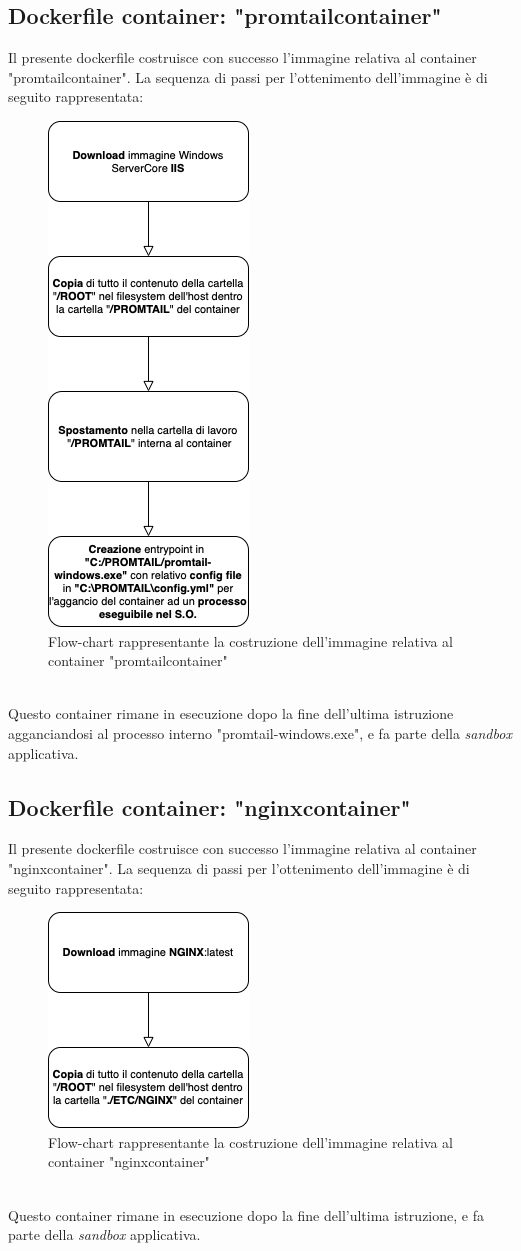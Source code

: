 \subsection{Dockerfile container: "promtailcontainer"}
Il presente dockerfile costruisce con successo l'immagine relativa al container "promtailcontainer". La sequenza di passi per l'ottenimento dell'immagine è di seguito rappresentata:
\begin{figure}[!h]     
\centering 
    \includegraphics[width=0.3\columnwidth]{immagini/flowchart/flowchart_promtailcontainer} 
    \caption{Flow-chart rappresentante la costruzione dell'immagine relativa al container "promtailcontainer"}
\end{figure} \\
Questo container rimane in esecuzione dopo la fine dell'ultima istruzione agganciandosi al processo interno "promtail-windows.exe", e fa parte della \textit{sandbox} applicativa.
\newpage
\subsection{Dockerfile container: "nginxcontainer"}
Il presente dockerfile costruisce con successo l'immagine relativa al container "nginxcontainer". La sequenza di passi per l'ottenimento dell'immagine è di seguito rappresentata:
\begin{figure}[!h]     
\centering 
    \includegraphics[width=0.3\columnwidth]{immagini/flowchart/flowchart_nginxcontainer} 
    \caption{Flow-chart rappresentante la costruzione dell'immagine relativa al container "nginxcontainer"}
\end{figure} \\
Questo container rimane in esecuzione dopo la fine dell'ultima istruzione, e fa parte della \textit{sandbox} applicativa.



